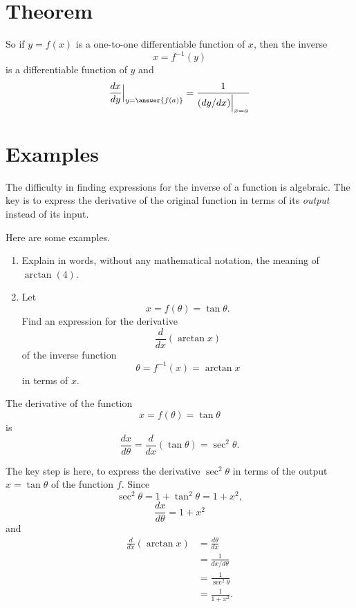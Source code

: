 \documentclass{ximera}
\begin{document}
\section{Theorem}
So if $y=f(x)$ is a one-to-one differentiable function of $x$, then the inverse  
\[
    x = f^{-1}(y)
\]
is a differentiable function of $y$ and
\[
   \frac{dx}{dy} \Big|_{y=\answer{f(a)}} =    \frac{1}{(dy/dx)\Big|_{x=a}}    %
\]


\section{Examples}

The difficulty in finding expressions for the inverse of a function is algebraic. The key is to express the derivative of the original function in terms of its \emph{output} instead of its input. 

Here are some examples.

\begin{question}  \label{Qpdef3rmv}
\begin{enumerate}
\item Explain in words, without any mathematical notation, the meaning of $\arctan (4)$.
\begin{freeResponse}
\end{freeResponse}

\item Let 
\[
    x = f(\theta) = \tan\theta .
\]
Find an expression for the derivative 
\[
  \frac{d}{dx}\left( \arctan x \right)
\]
of the inverse function
\[
  \theta = f^{-1}(x) = \arctan x
\]
in terms of $x$.

\end{enumerate}

\begin{explanation}
The derivative of the function 
\[
        x=f(\theta) = \tan\theta 
\]
is
\[
  \frac{dx}{d\theta} = \frac{d}{dx} \left( \tan\theta \right) = \sec^2\theta .
\]

The key step is here, to express the derivative $\sec^2\theta$ in terms of the output $x=\tan\theta$ of the function $f$. Since
\[
    \sec^2\theta = 1 + \tan^2\theta = 1 + x^2 ,
\]
\[
  \frac{dx}{d\theta} = 1 +  x^2
\]
and 
\begin{align*}
      \frac{d}{dx} \left( \arctan x \right)  &= \frac{d\theta}{dx} \\
                                                          &= \frac{1}{dx/d\theta} \\
                                                          &= \frac{1}{\sec^2\theta} \\
                                                          &= \frac{1}{1+x^2} . 
\end{align*}
\end{explanation}
\end{question}
\end{document}
